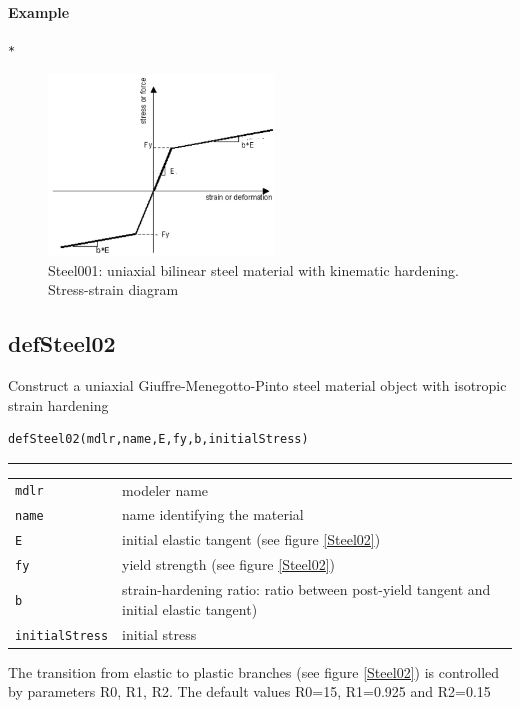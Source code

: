\paragraph{Example}
\begin{verbatim}
*
\end{verbatim}

\begin{figure}[h]
\centering
\includegraphics[width=60mm]{materials/figures/Steel01}
\caption{Steel001: uniaxial bilinear steel material with kinematic hardening. Stress-strain diagram}\label{Steel01}
\end{figure}


\subsection{defSteel02}
\noindent Construct a uniaxial Giuffre-Menegotto-Pinto steel material object with isotropic strain hardening
\begin{verbatim}
defSteel02(mdlr,name,E,fy,b,initialStress)
\end{verbatim}
\vspace{-10pt}
{\color{grayLines} \rule{\linewidth}{0.25pt}}
\begin{center}
\begin{tabular}{lp{10cm}}
{\tt mdlr} & modeler name \\
{\tt name} & name identifying the material \\
{\tt E} & initial elastic tangent (see figure \ref{Steel02}) \\
{\tt fy} &  yield strength (see figure \ref{Steel02})\\
{\tt b} &  strain-hardening ratio: ratio between post-yield tangent and initial elastic tangent)\\
{\tt initialStress} &  initial stress \\
\end{tabular}
\end{center}
{\footnotesize The transition from elastic to plastic branches  (see figure \ref{Steel02}) is controlled by parameters R0, R1, R2. The default values R0=15, R1=0.925 and R2=0.15}

